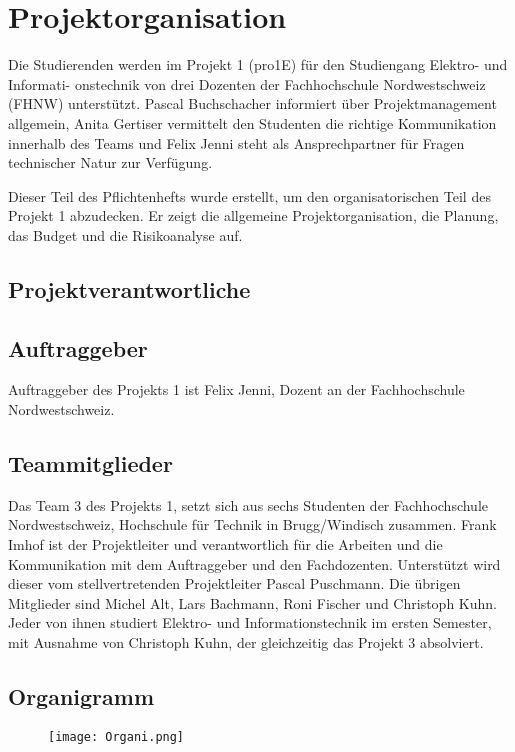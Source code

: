 \section{Projektorganisation}

Die Studierenden werden im Projekt 1 (pro1E) für den Studiengang Elektro- und Informati- onstechnik von drei Dozenten der Fachhochschule Nordwestschweiz (FHNW) unterstützt. Pascal Buchschacher informiert über Projektmanagement allgemein, Anita Gertiser vermittelt den Studenten die richtige Kommunikation innerhalb des Teams und Felix Jenni steht als Ansprechpartner für Fragen technischer Natur zur Verfügung.

Dieser Teil des Pflichtenhefts wurde erstellt, um den organisatorischen Teil des Projekt 1 abzudecken. Er zeigt die allgemeine Projektorganisation, die Planung, das Budget und die Risikoanalyse auf.
\subsection{Projektverantwortliche}

\subsection{Auftraggeber}
Auftraggeber des Projekts 1 ist Felix Jenni, Dozent an der Fachhochschule Nordwestschweiz.

\subsection{Teammitglieder}
Das Team 3 des Projekts 1, setzt sich aus sechs Studenten der Fachhochschule Nordwestschweiz, Hochschule für Technik in Brugg/Windisch zusammen. Frank Imhof ist der Projektleiter und verantwortlich für die Arbeiten und die Kommunikation mit dem Auftraggeber und den Fachdozenten. Unterstützt wird dieser vom stellvertretenden Projektleiter Pascal Puschmann. Die übrigen Mitglieder sind Michel Alt, Lars Bachmann, Roni Fischer und Christoph Kuhn. Jeder von ihnen studiert Elektro- und Informationstechnik im ersten Semester, mit Ausnahme von Christoph Kuhn, der gleichzeitig das Projekt 3 absolviert.

\subsection{Organigramm}
\begin{figure}[H]
	\centering
	\texttt{[image: Organi.png]}
	\label{fig:Organigramm}
\end{figure}
